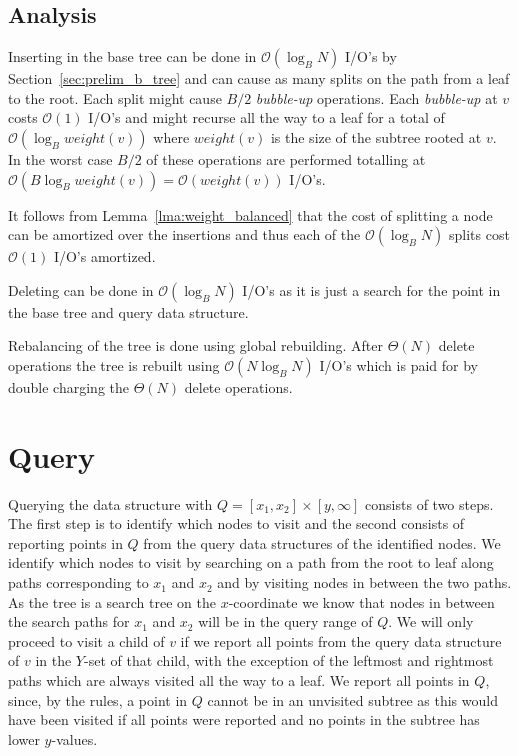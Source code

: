 \documentclass[twoside,11pt,openright]{report}
\begin{document}
\subsection{Analysis}
Inserting in the base tree can be done in $\mathcal{O}(\log_B N)$ I/O's by Section~\ref{sec:prelim_b_tree} and can cause as many splits on the path from a leaf to the root. Each split might cause $B/2$ \textit{bubble-up} operations. Each \textit{bubble-up} at $v$ costs $\mathcal{O}(1)$ I/O's and might recurse all the way to a leaf for a total of $\mathcal{O}(\log_B weight(v))$ where $weight(v)$ is the size of the subtree rooted at $v$. In the worst case $B/2$ of these operations are performed totalling at $\mathcal{O}(B\log_B weight(v)) = \mathcal{O}(weight(v))$ I/O's.

It follows from Lemma~\ref{lma:weight_balanced} that the cost of splitting a node can be amortized over the insertions and thus each of the $\mathcal{O}(\log_B N)$ splits cost $\mathcal{O}(1)$ I/O's amortized.

Deleting can be done in $\mathcal{O}(\log_B N)$ I/O's as it is just a search for the point in the base tree and query data structure.

Rebalancing of the tree is done using global rebuilding. After $\Theta(N)$ delete operations the tree is rebuilt using $\mathcal{O}(N \log_B N)$ I/O's which is paid for by double charging the $\Theta(N)$ delete operations.
\section{Query}
\label{sec:arge_query}
Querying the data structure with $Q = \left[ x_1, x_2 \right] \times \left[ y, \infty \right]$ consists of two steps. The first step is to identify which nodes to visit and the second consists of reporting points in $Q$ from the query data structures of the identified nodes. 
We identify which nodes to visit by searching on a path from the root to leaf along paths corresponding to $x_1$ and $x_2$ and by visiting nodes in between the two paths. As the tree is a search tree on the $x$-coordinate we know that nodes in between the search paths for $x_1$ and $x_2$ will be in the query range of $Q$.
We will only proceed to visit a child of $v$ if we report all points from the query data structure of $v$ in the $Y$-set of that child, with the exception of the leftmost and rightmost paths which are always visited all the way to a leaf.
We report all points in $Q$, since, by the rules, a point in $Q$ cannot be in an unvisited subtree as this would have been visited if all points were reported and no points in the subtree has lower $y$-values.
\end{document}
